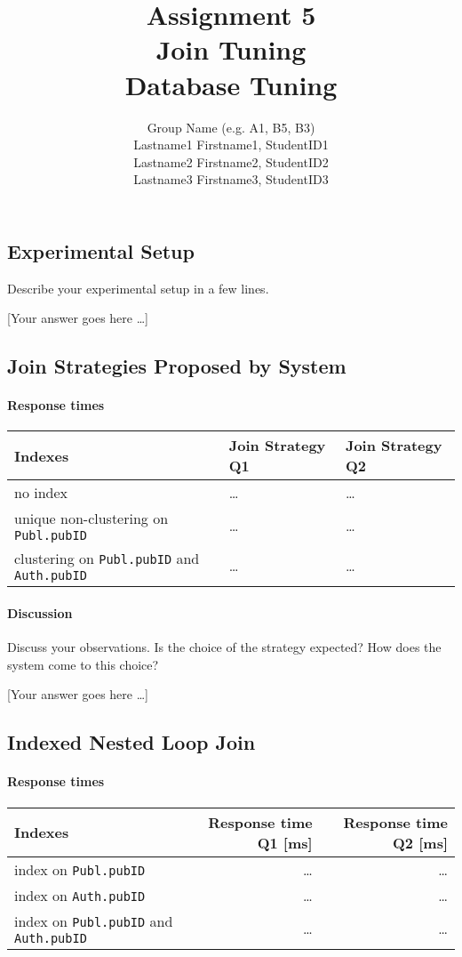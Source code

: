 \documentclass[11pt]{scrartcl}
\title{
  \textbf{\large Assignment 5} \\
  Join Tuning \\
  {\large Database Tuning}}
\author{
  Group Name (e.g. A1, B5, B3) \\
  \large Lastname1 Firstname1, StudentID1 \\
  \large Lastname2 Firstname2, StudentID2 \\
  \large Lastname3 Firstname3, StudentID3
}
\newcommand{\youranswerhere}{[Your answer goes here \ldots]}
\begin{document}
\maketitle

\subsection*{Experimental Setup}

Describe your experimental setup in a few lines.

\youranswerhere{}

\subsection*{Join Strategies Proposed by System}

\paragraph{Response times}\mbox{}

\begin{table}[H]
  \centering
  \begin{tabular}{l|l|l}
    Indexes & Join Strategy Q1 & Join Strategy Q2 \tabularnewline
    \hline
    no index & \ldots & \ldots \tabularnewline
    unique non-clustering on \texttt{Publ.pubID} & \ldots  & \ldots
      \tabularnewline
    clustering on \texttt{Publ.pubID} and \texttt{Auth.pubID} & \ldots & \ldots
      \tabularnewline
  \end{tabular}
\end{table}

\paragraph{Discussion}

Discuss your observations. Is the choice of the strategy expected? How does the system come to this choice?

\youranswerhere{}

\subsection*{Indexed Nested Loop Join}

\paragraph{Response times}\mbox{}

\begin{table}[H]
  \centering
  \begin{tabular}{l|r|r}
    Indexes & Response time Q1 [ms] & Response time Q2 [ms] \tabularnewline
    \hline
    index on \texttt{Publ.pubID} & \ldots & \ldots \tabularnewline
    index on \texttt{Auth.pubID} & \ldots & \ldots \tabularnewline
    index on \texttt{Publ.pubID} and \texttt{Auth.pubID} & \ldots & \ldots
        \tabularnewline
  \end{tabular}
\end{table}
\end{document}
